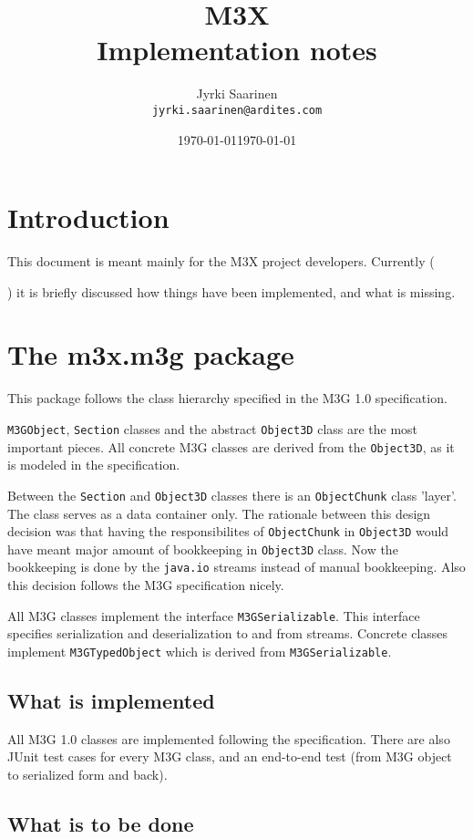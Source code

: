 \documentclass[a4paper,twoside]{article}
\title{M3X \\ Implementation notes}
\author{Jyrki Saarinen\\
   \texttt{jyrki.saarinen@ardites.com}
   }
\date{\today}
\begin{document}
\maketitle

\section{Introduction}

This document is meant mainly for the M3X project developers. 
Currently (\date{\today}) it is briefly discussed how things 
have been implemented, and what is missing.

\section{The m3x.m3g package}

This package follows the class hierarchy specified in the M3G 1.0 specification.

\texttt{M3GObject}, \texttt{Section} classes and the abstract \texttt{Object3D} 
class are the most important pieces. All concrete M3G classes are derived
from the \texttt{Object3D}, as it is modeled in the specification.

Between the \texttt{Section} and \texttt{Object3D} classes there is an
\texttt{ObjectChunk} class 'layer'. The class serves as a data container only.
The rationale between this design decision was that having the responsibilites
of \texttt{ObjectChunk} in \texttt{Object3D} would have meant major amount
of bookkeeping in \texttt{Object3D} class. Now the bookkeeping is done by the
\texttt{java.io} streams instead of manual bookkeeping.
Also this decision follows the M3G specification nicely.

All M3G classes implement the interface \texttt{M3GSerializable}. This interface
specifies serialization and deserialization to and from streams. Concrete classes
implement \texttt{M3GTypedObject} which is derived from \texttt{M3GSerializable}.

\subsection{What is implemented}

All M3G 1.0 classes are implemented following the specification. There are
also JUnit test cases for every M3G class, and an end-to-end test (from M3G object
to serialized form and back).

\subsection{What is to be done}
\end{document}
